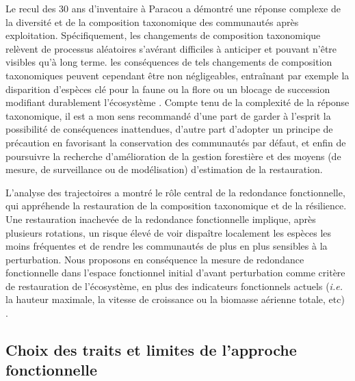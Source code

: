 \documentclass[
  11pt,
  french,
  A4paper,
  extrafontsizes,onecolumn,openright
  ]{memoir}
\begin{document}
Le recul des 30 ans d'inventaire à Paracou a démontré une réponse
complexe de la diversité et de la composition taxonomique des
communautés après exploitation. Spécifiquement, les changements de
composition taxonomique relèvent de processus aléatoires s'avérant
difficiles à anticiper et pouvant n'être visibles qu'à long terme. les
conséquences de tels changements de composition taxonomiques peuvent
cependant être non négligeables, entraînant par exemple la disparition
d'espèces clé pour la faune ou la flore ou un blocage de succession
modifiant durablement l'écosystème \autocite{Diaz2005}. Compte tenu de
la complexité de la réponse taxonomique, il est a mon sens recommandé
d'une part de garder à l'esprit la possibilité de conséquences
inattendues, d'autre part d'adopter un principe de précaution en
favorisant la conservation des communautés par défaut, et enfin de
poursuivre la recherche d'amélioration de la gestion forestière et des
moyens (de mesure, de surveillance ou de modélisation) d'estimation de
la restauration.

L'analyse des trajectoires a montré le rôle central de la redondance
fonctionnelle, qui appréhende la restauration de la composition
taxonomique et de la résilience. Une restauration inachevée de la
redondance fonctionnelle implique, après plusieurs rotations, un risque
élevé de voir dispaître localement les espèces les moins fréquentes et
de rendre les communautés de plus en plus sensibles à la perturbation.
Nous proposons en conséquence la mesure de redondance fonctionnelle dans
l'espace fonctionnel initial d'avant perturbation comme critère de
restauration de l'écosystème, en plus des indicateurs fonctionnels
actuels (\emph{i.e.} la hauteur maximale, la vitesse de croissance ou la
biomasse aérienne totale, etc) \autocite{Sist2015}.

\subsection{Choix des traits et limites de l'approche
fonctionnelle}\label{choix-des-traits-et-limites-de-lapproche-fonctionnelle}
\end{document}
